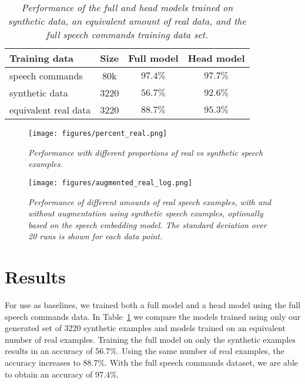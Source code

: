 \documentclass{article}
\begin{document}
\begin{table}[t]
    \centering
    \caption{\textit{Performance of the full and head models trained on synthetic data, an equivalent amount of real data, and the full speech commands training data set.}}
     \label{tab:model_accuracy}
    \begin{tabular}{l|c|c|c}
        Training data           &  Size   &   Full model          &   Head model         \\\hline
       speech commands         &  80k    &   $       97.4 \% $   &   $      97.7 \% $   \\
        synthetic data          &  3220   &   $       56.7 \% $   &   $      92.6 \% $   \\
        equivalent real data    &  3220   &   $       88.7 \% $   &   $      95.3 \% $   
    \end{tabular}
\end{table}

\begin{figure}[t]
    \centering
\texttt{[image: figures/percent\_real.png]}
    \caption{\textit{Performance with different proportions of real vs synthetic speech examples. \vspace{-0.3cm}}}
    \label{fig:real_replaced_syn}
\end{figure}

\begin{figure*}[t]
    \centering
\texttt{[image: figures/augmented\_real\_log.png]}
    \vspace{-0.1cm}
    \caption{\textit{Performance of different amounts of real speech examples, with and without augmentation using synthetic speech examples, optionally based on the speech embedding model. The standard deviation over 20 runs is shown for each data point. \vspace{-0.3cm}}}
    \label{fig:real_plus_syn}
\end{figure*}






\section{Results}
\label{sec:results}
For use as baselines, we trained both a full model and a head model using the full speech commands data. In Table~\ref{tab:model_accuracy} we compare the models trained using only our generated set of 3220 synthetic examples and models trained on an equivalent number of real examples.
Training the full model on only the synthetic examples results in an accuracy of 56.7\%. Using the same number of real examples, the accuracy increases to 88.7\%. With the full speech commands dataset, we are able to obtain an accuracy of 97.4\%.
\end{document}
